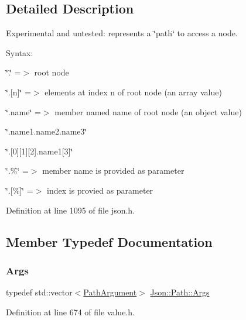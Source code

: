 \subsection{Detailed Description}
Experimental and untested\+: represents a \char`\"{}path\char`\"{} to access a node. 

Syntax\+:
\begin{DoxyItemize}
\item \char`\"{}.\char`\"{} =$>$ root node
\item \char`\"{}.\mbox{[}n\mbox{]}\char`\"{} =$>$ elements at index \textquotesingle{}n\textquotesingle{} of root node (an array value)
\item \char`\"{}.\+name\char`\"{} =$>$ member named \textquotesingle{}name\textquotesingle{} of root node (an object value)
\item \char`\"{}.\+name1.\+name2.\+name3\char`\"{}
\item \char`\"{}.\mbox{[}0\mbox{]}\mbox{[}1\mbox{]}\mbox{[}2\mbox{]}.\+name1\mbox{[}3\mbox{]}\char`\"{}
\item \char`\"{}.\%\char`\"{} =$>$ member name is provided as parameter
\item \char`\"{}.\mbox{[}\%\mbox{]}\char`\"{} =$>$ index is provied as parameter 
\end{DoxyItemize}

Definition at line 1095 of file json.\+h.



\subsection{Member Typedef Documentation}
\hypertarget{class_json_1_1_path_a27d96232d034d7a78286468676f9cb3e}{}\label{class_json_1_1_path_a27d96232d034d7a78286468676f9cb3e} 
\subsubsection{\texorpdfstring{Args}{Args}\hspace{0.1cm}{\footnotesize\ttfamily [1/2]}}
{\footnotesize\ttfamily typedef std\+::vector$<$\hyperlink{class_json_1_1_path_argument}{Path\+Argument}$>$ \hyperlink{class_json_1_1_path_a27d96232d034d7a78286468676f9cb3e}{Json\+::\+Path\+::\+Args}\hspace{0.3cm}{\ttfamily [private]}}



Definition at line 674 of file value.\+h.

